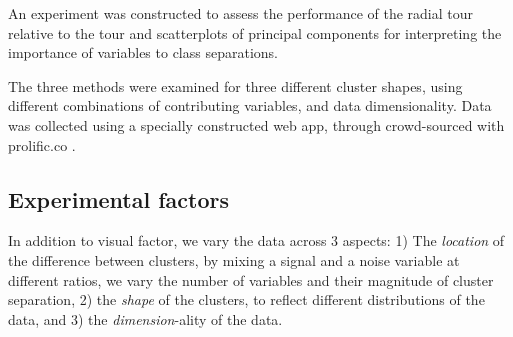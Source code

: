 \documentclass{template/monashthesis}
\begin{document}
An experiment was constructed to assess the performance of the radial tour relative to the tour and scatterplots of principal components for interpreting the importance of variables to class separations.

The three methods were examined for three different cluster shapes, using different combinations of contributing variables, and data dimensionality. Data was collected using a specially constructed web app, through crowd-sourced with prolific.co \autocite{palan_prolific_2018}.

\hypertarget{sec:blocks}{%
\subsection{Experimental factors}\label{sec:blocks}}

In addition to visual factor, we vary the data across 3 aspects: 1) The \emph{location} of the difference between clusters, by mixing a signal and a noise variable at different ratios, we vary the number of variables and their magnitude of cluster separation, 2) the \emph{shape} of the clusters, to reflect different distributions of the data, and 3) the \emph{dimension}-ality of the data.
\end{document}
